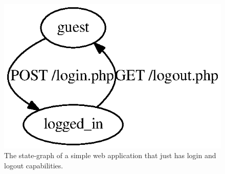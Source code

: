 \begin{figure}[tb]
  \centering
  \includegraphics{figures/simple_login_logout.ps}
  \caption{The state-graph of a simple web application that just has
    login and logout capabilities.}
\end{figure}

